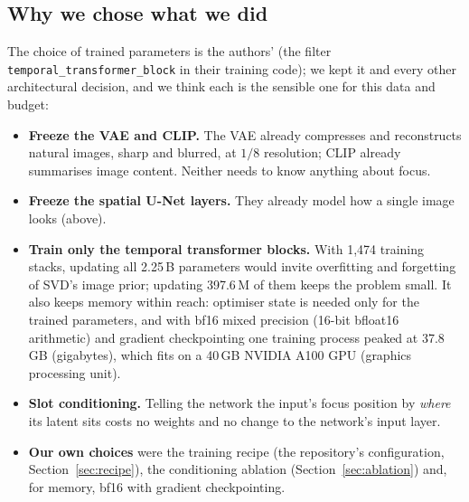 \documentclass[11pt]{article}
\begin{document}
\subsection{Why we chose what we did}\label{sec:why}
The choice of trained parameters is the authors' (the filter \texttt{temporal\_transformer\_block} in their training code); we kept it and every other architectural decision, and we think each is the sensible one for this data and budget:
\begin{itemize}[leftmargin=*,itemsep=2pt]
  \item \textbf{Freeze the VAE and CLIP.} The VAE already compresses and reconstructs natural images, sharp and blurred, at $1/8$ resolution; CLIP already summarises image content. Neither needs to know anything about focus.
  \item \textbf{Freeze the spatial U-Net layers.} They already model how a single image looks (above).
  \item \textbf{Train only the temporal transformer blocks.} With 1{,}474 training stacks, updating all 2.25\,B parameters would invite overfitting and forgetting of SVD's image prior; updating 397.6\,M of them keeps the problem small. It also keeps memory within reach: optimiser state is needed only for the trained parameters, and with bf16 mixed precision (16-bit bfloat16 arithmetic) and gradient checkpointing one training process peaked at 37.8\,GB (gigabytes), which fits on a 40\,GB NVIDIA A100 GPU (graphics processing unit).
  \item \textbf{Slot conditioning.} Telling the network the input's focus position by \emph{where} its latent sits costs no weights and no change to the network's input layer.
  \item \textbf{Our own choices} were the training recipe (the repository's configuration, Section~\ref{sec:recipe}), the conditioning ablation (Section~\ref{sec:ablation}) and, for memory, bf16 with gradient checkpointing.
\end{itemize}
\end{document}
